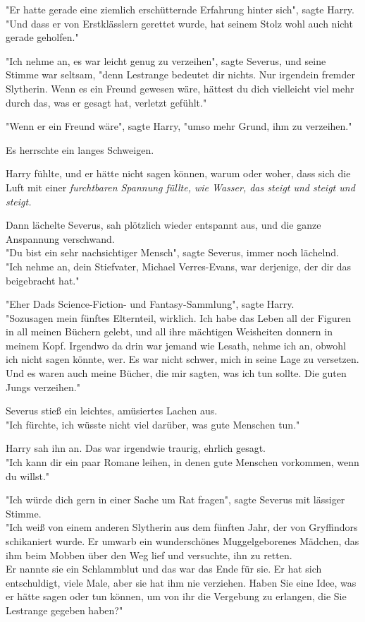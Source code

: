 {"Er hatte gerade eine ziemlich erschütternde Erfahrung hinter sich", sagte Harry.\\ "Und dass er von Erstklässlern gerettet wurde, hat seinem Stolz wohl auch nicht gerade geholfen."

"Ich nehme an, es war leicht genug zu verzeihen", sagte Severus, und seine Stimme war seltsam, "denn Lestrange bedeutet dir nichts. Nur irgendein fremder Slytherin. Wenn es ein Freund gewesen wäre, hättest du dich vielleicht viel mehr durch das, was er gesagt hat, verletzt gefühlt."

"Wenn er ein Freund wäre", sagte Harry, "umso mehr Grund, ihm zu verzeihen."

Es herrschte ein langes Schweigen.

Harry fühlte, und er hätte nicht sagen können, warum oder woher, dass sich die Luft mit einer \emph{furchtbaren Spannung füllte, wie Wasser, das steigt und steigt und steigt.}

Dann lächelte Severus, sah plötzlich wieder entspannt aus, und die ganze Anspannung verschwand.\\ "Du bist ein sehr nachsichtiger Mensch", sagte Severus, immer noch lächelnd.\\ "Ich nehme an, dein Stiefvater, Michael Verres-Evans, war derjenige, der dir das beigebracht hat."

"Eher Dads Science-Fiction- und Fantasy-Sammlung", sagte Harry.\\ "Sozusagen mein fünftes Elternteil, wirklich. Ich habe das Leben all der Figuren in all meinen Büchern gelebt, und all ihre mächtigen Weisheiten donnern in meinem Kopf. Irgendwo da drin war jemand wie Lesath, nehme ich an, obwohl ich nicht sagen könnte, wer. Es war nicht schwer, mich in seine Lage zu versetzen.\\ Und es waren auch meine Bücher, die mir sagten, was ich tun sollte. Die guten Jungs verzeihen."

Severus stieß ein leichtes, amüsiertes Lachen aus.\\ "Ich fürchte, ich wüsste nicht viel darüber, was gute Menschen tun."

Harry sah ihn an. Das war irgendwie traurig, ehrlich gesagt.\\ "Ich kann dir ein paar Romane leihen, in denen gute Menschen vorkommen, wenn du willst."

"Ich würde dich gern in einer Sache um Rat fragen", sagte Severus mit lässiger Stimme.\\ "Ich weiß von einem anderen Slytherin aus dem fünften Jahr, der von Gryffindors schikaniert wurde. Er umwarb ein wunderschönes Muggelgeborenes Mädchen, das ihm beim Mobben über den Weg lief und versuchte, ihn zu retten.\\ Er nannte sie ein Schlammblut und das war das Ende für sie. Er hat sich entschuldigt, viele Male, aber sie hat ihm nie verziehen. Haben Sie eine Idee, was er hätte sagen oder tun können, um von ihr die Vergebung zu erlangen, die Sie Lestrange gegeben haben?"

}
